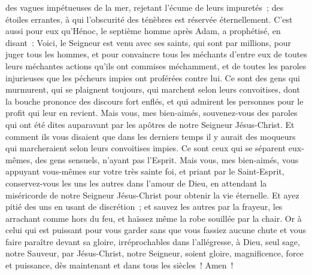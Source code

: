 \begin{multicols}{2}
des vagues impétueuses de la mer, rejetant l'écume de leurs impuretés~; des étoiles errantes, à qui l'obscurité des ténèbres est réservée éternellement.
C'est aussi pour eux qu'Hénoc, le septième homme après Adam, a prophétisé, en disant~:
Voici, le Seigneur est venu avec ses saints, qui sont par millions, pour juger tous les hommes, et pour convaincre tous les méchants d'entre eux de toutes leurs méchantes actions qu'ils ont commises méchamment, et de toutes les paroles injurieuses que les pécheurs impies ont proférées contre lui.
Ce sont des gens qui murmurent, qui se plaignent toujours, qui marchent selon leurs convoitises, dont la bouche prononce des discours fort enflés, et qui admirent les personnes pour le profit qui leur en revient.
Mais vous, mes bien-aimés, souvenez-vous des paroles qui ont été dites auparavant par les apôtres de notre Seigneur Jésus-Christ.
Et comment ils vous disaient que dans les derniers temps il y aurait des moqueurs qui marcheraient selon leurs convoitises impies.
Ce sont ceux qui se séparent eux-mêmes, des gens sensuels, n'ayant pas l'Esprit.
Mais vous, mes bien-aimés, vous appuyant vous-mêmes sur votre très sainte foi, et priant par le Saint-Esprit,
conservez-vous les uns les autres dans l'amour de Dieu, en attendant la miséricorde de notre Seigneur Jésus-Christ pour obtenir la vie éternelle.
Et ayez pitié des uns en usant de discrétion~;
et sauvez les autres par la frayeur, les arrachant comme hors du feu, et haïssez même la robe souillée par la chair.
Or à celui qui est puissant pour vous garder sans que vous fassiez aucune chute et vous faire paraître devant sa gloire, irréprochables dans l'allégresse,
à Dieu, seul sage, notre Sauveur, par Jésus-Christ, notre Seigneur, soient gloire, magnificence, force et puissance, dès maintenant et dans tous les siècles~! Amen~!
\PPE{}
\end{multicols}
